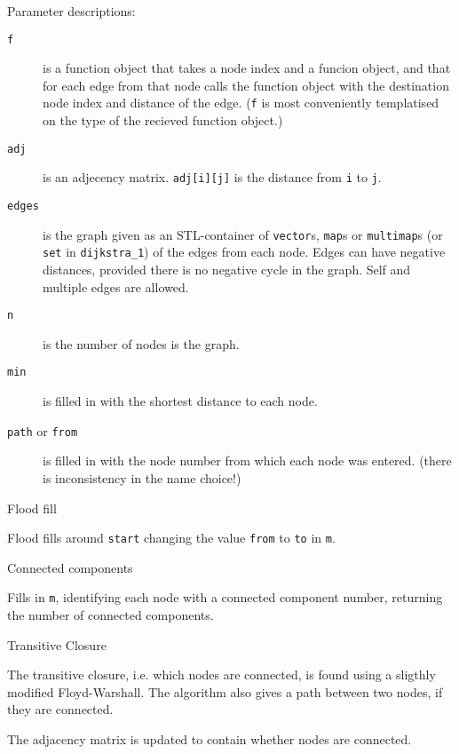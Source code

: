
Parameter descriptions:
\begin{description}
\item[{\tt f}] is a function object that takes a node index and a funcion
object, and that for each edge from that node calls the function object with
the destination node index and distance of the edge. ({\tt f} is most
conveniently templatised on the type of the recieved function object.)
\item[{\tt adj}] is an adjecency matrix. {\tt adj[i][j]} is the distance
   from {\tt i} to {\tt j}.
\item[{\tt edges}] is the graph given as an STL-container of
   {\tt vector}s, {\tt map}s or {\tt multimap}s
   (or {\tt set} in {\tt dijkstra\_1}) of the edges from each node.
   Edges can have negative distances, provided there is no negative cycle in
   the graph.
   Self and multiple edges are allowed.
\item[{\tt n}] is the number of nodes is the graph.
\item[{\tt min}] is filled in with the shortest distance to each node.
\item[{\tt path} or {\tt from}] is filled in with the node number from which
   each node was entered. (there is inconsistency in the name choice!)
\end{description}

\begin{algorithm}{Flood fill}

Flood fills around {\tt start} changing the value {\tt from} to {\tt to}
in {\tt m}.
\end{algorithm}

\begin{algorithm}{Connected components}

Fills in {\tt m}, identifying each node with a connected component number,
returning the number of connected components.
\end{algorithm}

\begin{algorithm}{Transitive Closure}

The transitive closure, i.e. which nodes are connected, is found using
a sligthly modified Floyd-Warshall. The algorithm also gives a path between
two nodes, if they are connected.

The adjacency matrix is updated to contain whether nodes are connected.
\end{algorithm}

